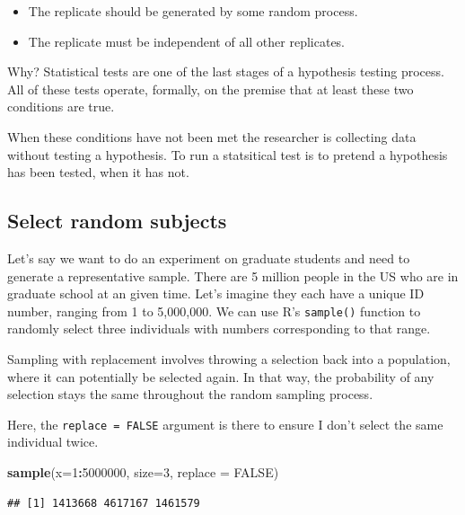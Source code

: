 \documentclass[]{book}
\newenvironment{Shaded}{\begin{snugshade}}{\end{snugshade}}
\newcommand{\DataTypeTok}[1]{\textcolor[rgb]{0.13,0.29,0.53}{#1}}
\newcommand{\DecValTok}[1]{\textcolor[rgb]{0.00,0.00,0.81}{#1}}
\newcommand{\KeywordTok}[1]{\textcolor[rgb]{0.13,0.29,0.53}{\textbf{#1}}}
\newcommand{\NormalTok}[1]{#1}
\newcommand{\OperatorTok}[1]{\textcolor[rgb]{0.81,0.36,0.00}{\textbf{#1}}}
\newcommand{\OtherTok}[1]{\textcolor[rgb]{0.56,0.35,0.01}{#1}}
\providecommand{\tightlist}{%
  \setlength{\itemsep}{0pt}\setlength{\parskip}{0pt}}
\begin{document}
\begin{itemize}
\tightlist
\item
  The replicate should be generated by some random process.
\item
  The replicate must be independent of all other replicates.
\end{itemize}

Why? Statistical tests are one of the last stages of a hypothesis testing process. All of these tests operate, formally, on the premise that at least these two conditions are true.

When these conditions have not been met the researcher is collecting data without testing a hypothesis. To run a statsitical test is to pretend a hypothesis has been tested, when it has not.

\hypertarget{select-random-subjects}{%
\subsection{Select random subjects}\label{select-random-subjects}}

Let's say we want to do an experiment on graduate students and need to generate a representative sample. There are 5 million people in the US who are in graduate school at an given time. Let's imagine they each have a unique ID number, ranging from 1 to 5,000,000. We can use R's \texttt{sample()} function to randomly select three individuals with numbers corresponding to that range.

Sampling with replacement involves throwing a selection back into a population, where it can potentially be selected again. In that way, the probability of any selection stays the same throughout the random sampling process.

Here, the \texttt{replace\ =\ FALSE} argument is there to ensure I don't select the same individual twice.

\begin{Shaded}
\begin{Highlighting}[]
\KeywordTok{sample}\NormalTok{(}\DataTypeTok{x=}\DecValTok{1}\OperatorTok{:}\DecValTok{5000000}\NormalTok{, }\DataTypeTok{size=}\DecValTok{3}\NormalTok{, }\DataTypeTok{replace =} \OtherTok{FALSE}\NormalTok{)}
\end{Highlighting}
\end{Shaded}

\begin{verbatim}
## [1] 1413668 4617167 1461579
\end{verbatim}
\end{document}
